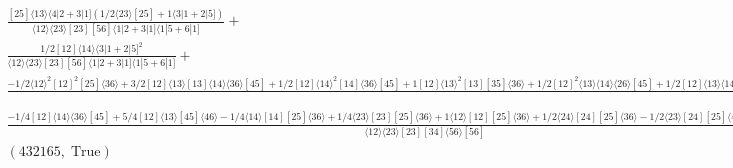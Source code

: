 \documentclass[varwidth, border=5pt]{standalone}
\begin{document}
\begin{my}
$\begin{gathered}
\scriptscriptstyle\frac{[25]⟨13⟩⟨4|2+3|1](1/2⟨23⟩[25]+1⟨3|1+2|5])}{⟨12⟩⟨23⟩[23][56]⟨1|2+3|1]⟨1|5+6|1]}+\\
\scriptscriptstyle\frac{1/2[12]⟨14⟩⟨3|1+2|5]^2}{⟨12⟩⟨23⟩[23][56]⟨1|2+3|1]⟨1|5+6|1]}+\\
\scriptscriptstyle\frac{-1/2⟨12⟩^2[12]^2[25]⟨36⟩+3/2[12]⟨13⟩[13]⟨14⟩⟨36⟩[45]+1/2[12]⟨14⟩^2[14]⟨36⟩[45]+1[12]⟨13⟩^2[13][35]⟨36⟩+1/2[12]^2⟨13⟩⟨14⟩⟨26⟩[45]+1/2[12]⟨13⟩⟨14⟩[14][45]⟨46⟩-1/2[12]⟨14⟩⟨34⟩[34]⟨36⟩[45]+1[12]⟨13⟩^2[14][35]⟨46⟩-1/2[12]⟨13⟩^2[13][45]⟨46⟩+1/2[12]^2⟨13⟩^2⟨26⟩[35]+1/2[12]⟨13⟩⟨34⟩[34][45]⟨46⟩-1/2[12]⟨13⟩⟨34⟩[34][35]⟨36⟩+1/2[12]⟨13⟩^2[13][15]⟨16⟩+1/2[12]⟨13⟩⟨14⟩[14][15]⟨16⟩+1/2⟨23⟩[24]^2⟨34⟩[35]⟨46⟩+1⟨12⟩[12][24]⟨34⟩[45]⟨46⟩+1⟨14⟩[14][24]⟨34⟩[45]⟨46⟩+1/2[13]⟨14⟩[24]⟨34⟩⟨36⟩[45]-1/2⟨14⟩[14][24]⟨34⟩[35]⟨36⟩-1/2⟨13⟩[13][23]⟨34⟩⟨36⟩[45]+1⟨13⟩[14][24]⟨34⟩[35]⟨46⟩+1/2⟨13⟩[13][24]⟨34⟩[35]⟨36⟩-1/2⟨23⟩[23]^2⟨34⟩⟨36⟩[45]+1/2⟨23⟩[23][24]⟨34⟩[35]⟨36⟩-1/2⟨23⟩[23][24]⟨34⟩[45]⟨46⟩}{⟨12⟩⟨23⟩[23][34]⟨56⟩[56]⟨1|5+6|1]}+\\
\scriptscriptstyle\frac{-1/4[12]⟨14⟩⟨36⟩[45]+5/4[12]⟨13⟩[45]⟨46⟩-1/4⟨14⟩[14][25]⟨36⟩+1/4⟨23⟩[23][25]⟨36⟩+1⟨12⟩[12][25]⟨36⟩+1/2⟨24⟩[24][25]⟨36⟩-1/2⟨23⟩[24][25]⟨46⟩+1[12]⟨13⟩[25]⟨26⟩}{⟨12⟩⟨23⟩[23][34]⟨56⟩[56]}+\\
\scriptscriptstyle(432165,\;\text{True})\phantom{+}
\end{gathered}$
\end{my}
\end{document}
